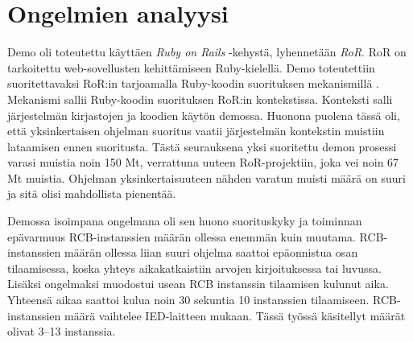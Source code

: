\section{Ongelmien analyysi}
Demo oli toteutettu käyttäen \emph{Ruby on Rails} -kehystä, lyhennetään \emph{RoR}. RoR on tarkoitettu web-sovellusten kehittämiseen Ruby-kielellä. Demo toteutettiin suoritettavaksi RoR:in tarjoamalla Ruby-koodin suorituksen mekanismillä \cite{rails-runner}. Mekanismi sallii Ruby-koodin suorituksen RoR:in kontekstissa. Konteksti salli järjestelmän kirjastojen ja koodien käytön demossa. Huonona puolena tässä oli, että yksinkertaisen ohjelman suoritus vaatii järjestelmän kontekstin muistiin lataamisen ennen suoritusta. Tästä seurauksena yksi suoritettu demon prosessi varasi muistia noin 150 Mt, verrattuna uuteen RoR-projektiin, joka vei noin 67 Mt muistia. Ohjelman yksinkertaisuuteen nähden varatun muisti määrä on suuri ja sitä olisi mahdollista pienentää.

Demossa isoimpana ongelmana oli sen huono suorituskyky ja toiminnan epävarmuus RCB-instanssien määrän ollessa enemmän kuin muutama. RCB-instanssien määrän ollessa liian suuri ohjelma saattoi epäonnistua osan tilaamisessa, koska yhteys aikakatkaistiin arvojen kirjoituksessa tai luvussa. Lisäksi ongelmaksi muodostui usean RCB instanssin tilaamisen kulunut aika. Yhteensä aikaa saattoi kulua noin 30 sekuntia 10 instanssien tilaamiseen. RCB-instanssien määrä vaihtelee IED-laitteen mukaan. Tässä työssä käsitellyt määrät olivat 3--13 instanssia.

